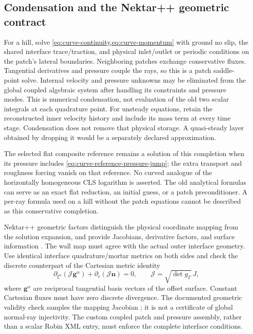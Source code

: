 \documentclass[11pt,a4paper]{article}
\numberwithin{equation}{section}
\begin{document}
\subsection{Condensation and the Nektar++ geometric contract}
For a hill, solve \cref{eq:curve-continuity,eq:curve-momentum} with
ground no slip, the shared interface trace/traction, and physical
inlet/outlet or periodic conditions on the patch's lateral boundaries.
Neighboring patches exchange conservative fluxes. Tangential
derivatives and pressure couple the rays, so this is a patch
saddle-point solve. Internal velocity and pressure unknowns may be
eliminated from the global coupled algebraic system after handling
its constraints and pressure modes. This is numerical condensation,
not evaluation of the old two scalar integrals at each quadrature point.
For unsteady equations, retain the reconstructed inner velocity
history and include its mass term at every time stage. Condensation
does not remove that physical storage. A quasi-steady layer obtained
by dropping it would be a separately declared approximation.

The selected flat composite reference remains a solution of this
completion when its pressure includes
\cref{eq:curve-reference-pressure-jump}; the extra transport and
roughness forcing vanish on that reference. No curved analogue of
the horizontally homogeneous CLS logarithm is asserted. The old
analytical formulas can serve as an exact flat reduction, an initial
guess, or a patch preconditioner. A per-ray formula used on a hill
without the patch equations cannot be described as this conservative
completion.

Nektar++ geometric factors distinguish the physical coordinate
mapping from the solution expansion, and provide Jacobians,
derivative factors, and surface information \cite{NektarGeometry}.
The wall map must agree with the actual outer interface geometry.
Use identical interface quadrature/mortar metrics on both sides and
check the discrete counterpart of the Cartesian metric identity
\begin{equation}
 \partial_{\xi^\alpha}(\mathcal J\bm g^\alpha)
       +\partial_r(\mathcal J\bm n)=0,
 \qquad \mathcal J=\sqrt{\det g_\Gamma}\,J,
 \label{eq:curve-metric-identity}
\end{equation}
where $\bm g^\alpha$ are reciprocal tangential basis vectors of the
offset surface. Constant Cartesian fluxes must have zero discrete
divergence. The documented geometric validity check samples the
mapping Jacobian \cite{NektarGeometry}; it is not a certificate of
global normal-ray injectivity. The custom coupled patch and pressure
assembly, rather than a scalar Robin XML entry, must enforce the
complete interface conditions.
\end{document}

